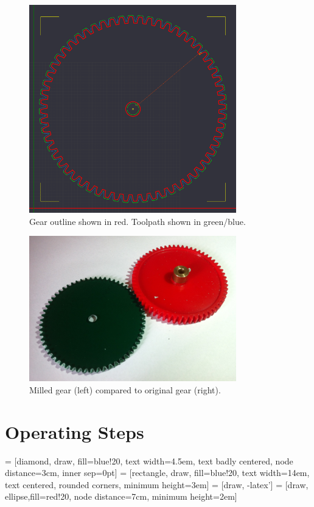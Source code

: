 \documentclass[a4paper,11pt]{article}  %
\begin{document}
\begin{figure}[ht!]
\centering
\includegraphics[width=90mm]{resources/gear_cambam.png}
\caption{Gear outline shown in red. Toolpath shown in green/blue.}
\label{overflow}
\end{figure}

\begin{figure}[ht!]
\centering
\includegraphics[width=90mm]{resources/gear_comparison.jpg}
\caption{Milled gear (left) compared to original gear (right).}
\label{fig:gearcomparison}
\end{figure}

\section{Operating Steps}

 = [diamond, draw, fill=blue!20, 
    text width=4.5em, text badly centered, node distance=3cm, inner sep=0pt]
 = [rectangle, draw, fill=blue!20, 
    text width=14em, text centered, rounded corners, minimum height=3em]
 = [draw, -latex']
 = [draw, ellipse,fill=red!20, node distance=7cm,
    minimum height=2em]
    
\end{document}
